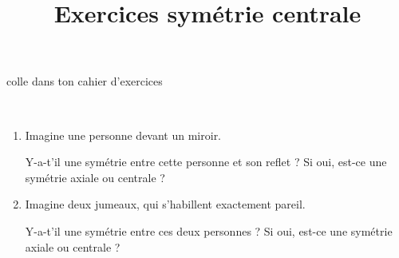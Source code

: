 \documentclass[a4paper,12pt]{article}
\title{Exercices symétrie centrale}
\date{}
\author{}
\makeatletter
\renewcommand{\maketitle}{%
{\tiny colle dans ton cahier d'exercices}
	\begin{center}
		\LARGE
		\uline{\@title}
		\vspace{1em}
	\end{center}
}
\makeatother
\begin{document}
\maketitle

\begin{exercice}\ \\
	\begin{enumerate}
		\item Imagine une personne devant un miroir.

		      Y-a-t'il une symétrie entre cette personne et son reflet ? Si oui, est-ce une symétrie axiale ou centrale ? \vspace{4em}
		\item Imagine deux jumeaux, qui s'habillent exactement pareil.

		      Y-a-t'il une symétrie entre ces deux personnes ? Si oui, est-ce une symétrie axiale ou centrale ? \vspace{4em}
	\end{enumerate}
\end{exercice}
\end{document}
